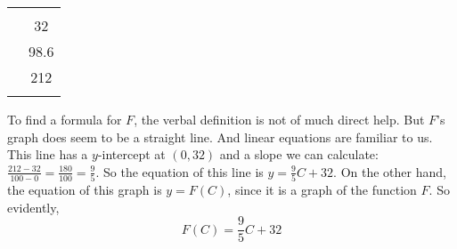 \begin{pccexample}
\begin{pccsolution}
\begin{table}[!htb]
	\begin{minipage}{.4\textwidth}
		\centering
		\label{fun:tab:fahrenheit}
		\begin{tabular}{S[table-format=3.0]S[table-format=3.1]}
			\beforeheading
			 &  \\ 
			             & 32               \\            & 98.6             \\           & 212              \\\lastline
		\end{tabular}
	\end{minipage}%
	\begin{minipage}{.6\textwidth}
		\centering
				
		\label{fun:fig:fahrenheit}
	\end{minipage}%
\end{table}

To find a formula for $F$, the verbal definition is not of much direct help. But $F$'s graph does seem to be a straight line. And linear equations are familiar to us. This line has a $y$-intercept at $(0,32)$ and a slope we can calculate: $\frac{212-32}{100-0}=\frac{180}{100}=\frac{9}{5}$. So the equation of this line is $y=\frac{9}{5}C+32$. On the other hand, the equation of this graph is $y=F(C)$, since it is a graph of the function $F$. So evidently, 
\[
F(C)=\frac{9}{5}C+32
\]
\end{pccsolution}
\end{pccexample}

